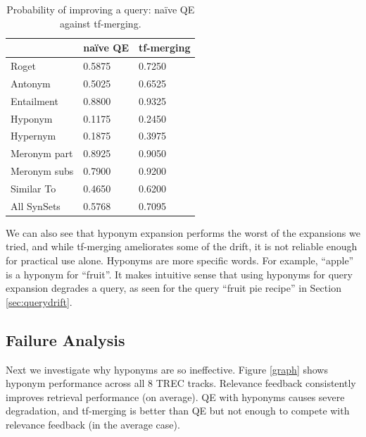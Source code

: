 \begin{table}[h]
    \centering
    \begin{tabular}{l|l|l|}
        \cline{2-3}
                                           & na{\"i}ve QE & tf-merging \\ \hline
        \multicolumn{1}{|l|}{Roget}        & 0.5875          & 0.7250     \\
        \multicolumn{1}{|l|}{Antonym}      & 0.5025          & 0.6525     \\
        \multicolumn{1}{|l|}{Entailment}   & 0.8800          & 0.9325     \\
        \multicolumn{1}{|l|}{Hyponym}     & 0.1175          & 0.2450     \\
        \multicolumn{1}{|l|}{Hypernym}      & 0.1875          & 0.3975     \\
        \multicolumn{1}{|l|}{Meronym part} & 0.8925          & 0.9050     \\
        \multicolumn{1}{|l|}{Meronym subs} & 0.7900          & 0.9200     \\
        \multicolumn{1}{|l|}{Similar To}   & 0.4650          & 0.6200     \\
        \multicolumn{1}{|l|}{All SynSets}  & 0.5768          & 0.7095     \\ \hline
    \end{tabular}
    \caption{Probability of improving a query: na{\"i}ve QE against tf-merging.}
    \label{probability}
\end{table}

We can also see that hyponym expansion performs the worst of the expansions we tried, and while tf-merging ameliorates some of the drift, it is not reliable enough for practical use alone. Hyponyms are more specific words. For example, ``apple'' is a hyponym for ``fruit''. It makes intuitive sense that using hyponyms for query expansion degrades a query, as seen for the query ``fruit pie recipe'' in Section \ref{sec:querydrift}. 

\subsection{Failure Analysis}
Next we investigate why hyponyms are so ineffective. Figure \ref{graph} shows hyponym performance across all 8 TREC tracks. Relevance feedback consistently improves retrieval performance (on average). QE with hyponyms causes severe degradation, and tf-merging is better than QE but not enough to compete with relevance feedback (in the average case).

